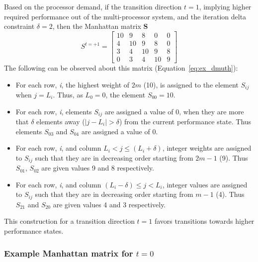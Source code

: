 Based on the processor demand, if the transition direction $t = 1$, implying higher required performance
out of the multi-processor system, and the iteration delta constraint $\delta = 2$, then the Manhattan matrix \textbf{S} 
\begin{equation}
    S^{t = +1} = \left[
     \begin{array}{ccccc}
       10 & 9 & 8 & 0 & 0 \\
       4 & 10 & 9 & 8 & 0 \\
       3 & 4 & 10 & 9 & 8 \\
       0 & 3 & 4 & 10 & 9
     \end{array}
   \right]
\label{eq:ex_dmuth}
\end{equation}
The following can be observed about this matrix (Equation~\eqref{eq:ex_dmuth}):
\begin{itemize}
\item For each row, \textit{i}, the highest weight of $2m$ (10), is assigned to the element 
$S_{ij}$ when $j = L_i$. Thus, as $L_0 = 0$, the element $S_{00} = 10$.
\item For each row, \textit{i}, elements $S_{ij}$ are assigned a value of 0,
when they are more that $\delta$ elements away ($|j - L_i| > \delta$) 
from the current performance state. Thus elements $S_{03}$ and $S_{04}$ are assigned a value of 0.
\item For each row, \textit{i}, and column $L_i < j \leq (L_i + \delta)$, integer weights are assigned 
to $S_{ij}$ such that they are in decreasing order starting from $2m-1$ (9).
Thus $S_{01}$, $S_{02}$ are given values 9 and 8 respectively. 
\item For each row, \textit{i}, and column $(L_i - \delta) \leq j < L_i$, integer values are assigned to 
$S_{ij}$ such that they are in decreasing order starting from $m-1$ (4).
Thus $S_{21}$ and $S_{20}$ are given values 4 and 3 respectively.
\end{itemize}
This construction for a transition direction $t = 1$ favors transitions towards higher performance states.


\subsubsection{Example Manhattan matrix for $t = 0$}~\label{sec:delta_matrix_m}

